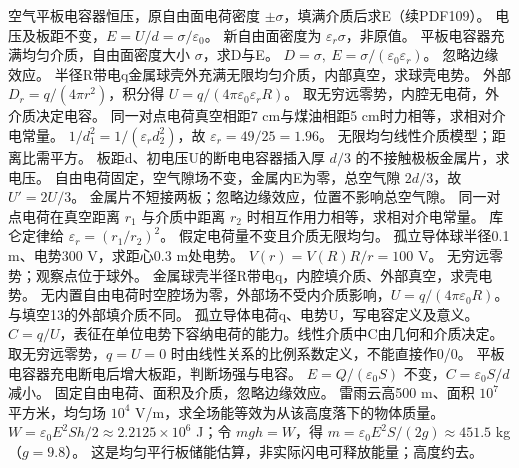 \problemtext 空气平板电容器恒压，原自由面电荷密度 $\pm\sigma$，填满介质后求E（续PDF109）。
\workings 电压及板距不变，$E=U/d=\sigma/\varepsilon_0$。
\crosscheck 新自由面密度为 $\varepsilon_r\sigma$，非原值。
\problemtext 平板电容器充满均匀介质，自由面密度大小 $\sigma$，求D与E。
\workings $D=\sigma,\ E=\sigma/(\varepsilon_0\varepsilon_r)$。
\crosscheck 忽略边缘效应。
\problemtext 半径R带电q金属球壳外充满无限均匀介质，内部真空，求球壳电势。
\workings 外部 $D_r=q/(4\pi r^2)$，积分得 $U=q/(4\pi\varepsilon_0\varepsilon_r R)$。
\crosscheck 取无穷远零势，内腔无电荷，外介质决定电容。
\problemtext 同一对点电荷真空相距7 cm与煤油相距5 cm时力相等，求相对介电常量。
\workings $1/d_1^2=1/(\varepsilon_r d_2^2)$，故 $\varepsilon_r=49/25=1.96$。
\crosscheck 无限均匀线性介质模型；距离比需平方。
\problemtext 板距d、初电压U的断电电容器插入厚 $d/3$ 的不接触极板金属片，求电压。
\workings 自由电荷固定，空气隙场不变，金属内E为零，总空气隙 $2d/3$，故 $U'=2U/3$。
\crosscheck 金属片不短接两板；忽略边缘效应，位置不影响总空气隙。
\problemtext 同一对点电荷在真空距离 $r_1$ 与介质中距离 $r_2$ 时相互作用力相等，求相对介电常量。
\workings 库仑定律给 $\varepsilon_r=(r_1/r_2)^2$。
\crosscheck 假定电荷量不变且介质无限均匀。
\problemtext 孤立导体球半径0.1 m、电势300 V，求距心0.3 m处电势。
\workings $V(r)=V(R)R/r=100$ V。
\crosscheck 无穷远零势；观察点位于球外。
\problemtext 金属球壳半径R带电q，内腔填介质、外部真空，求壳电势。
\workings 无内置自由电荷时空腔场为零，外部场不受内介质影响，$U=q/(4\pi\varepsilon_0R)$。
\crosscheck 与填空13的外部填介质不同。
\problemtext 孤立导体电荷q、电势U，写电容定义及意义。
\workings $C=q/U$，表征在单位电势下容纳电荷的能力。线性介质中C由几何和介质决定。
\crosscheck 取无穷远零势，$q=U=0$ 时由线性关系的比例系数定义，不能直接作0/0。
\problemtext 平板电容器充电断电后增大板距，判断场强与电容。
\workings $E=Q/(\varepsilon_0 S)$ 不变，$C=\varepsilon_0S/d$ 减小。
\crosscheck 固定自由电荷、面积及介质，忽略边缘效应。
\problemtext 雷雨云高500 m、面积 $10^7$ 平方米，均匀场 $10^4$ V/m，求全场能等效为从该高度落下的物体质量。
\workings $W=\varepsilon_0E^2Sh/2\approx2.2125\times10^6$ J；令 $mgh=W$，得 $m=\varepsilon_0E^2 S/(2g)\approx451.5$ kg（$g=9.8$）。
\crosscheck 这是均匀平行板储能估算，非实际闪电可释放能量；高度约去。
